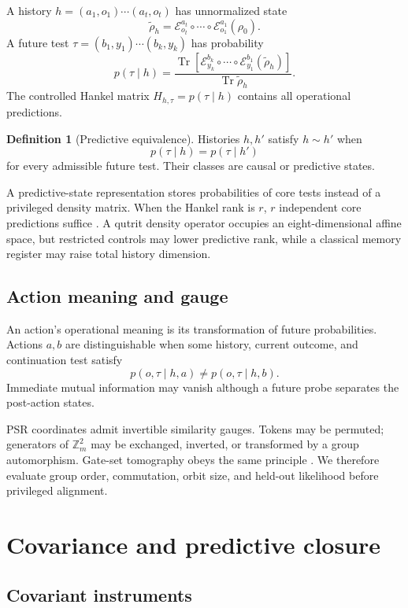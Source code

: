\documentclass[11pt]{article}
\theoremstyle{definition}
\newtheorem{definition}[theorem]{Definition}
\theoremstyle{remark}
\newcommand{\cE}{\mathcal E}
\newcommand{\Tr}{\operatorname{Tr}}
\newcommand{\Z}{\mathbb Z}
\begin{document}
A history \(h=(a_1,o_1)\cdots(a_t,o_t)\) has unnormalized state
\[
\widetilde\rho_h=
\cE_{o_t}^{a_t}\circ\cdots\circ\cE_{o_1}^{a_1}(\rho_0).
\]
A future test \(\tau=(b_1,y_1)\cdots(b_k,y_k)\) has probability
\[
p(\tau\mid h)=
\frac{\Tr[
\cE_{y_k}^{b_k}\circ\cdots\circ\cE_{y_1}^{b_1}
(\widetilde\rho_h)]}{\Tr\widetilde\rho_h}.
\]
The controlled Hankel matrix \(H_{h,\tau}=p(\tau\mid h)\) contains all
operational predictions.

\begin{definition}[Predictive equivalence]
Histories \(h,h'\) satisfy \(h\sim h'\) when
\[
p(\tau\mid h)=p(\tau\mid h')
\]
for every admissible future test. Their classes are causal or predictive
states.
\end{definition}

A predictive-state representation stores probabilities of core tests instead
of a privileged density matrix. When the Hankel rank is \(r\), \(r\)
independent core predictions suffice \cite{Littman2001}. A qutrit density
operator occupies an eight-dimensional affine space, but restricted controls
may lower predictive rank, while a classical memory register may raise total
history dimension.

\subsection{Action meaning and gauge}

An action's operational meaning is its transformation of future
probabilities. Actions \(a,b\) are distinguishable when some history, current
outcome, and continuation test satisfy
\[
p(o,\tau\mid h,a)\ne p(o,\tau\mid h,b).
\]
Immediate mutual information may vanish although a future probe separates the
post-action states.

PSR coordinates admit invertible similarity gauges. Tokens may be permuted;
generators of \(\Z_m^2\) may be exchanged, inverted, or transformed by a
group automorphism. Gate-set tomography obeys the same principle
\cite{NielsenGST2020,DiMatteo2020}. We therefore evaluate group order,
commutation, orbit size, and held-out likelihood before privileged alignment.

\section{Covariance and predictive closure}

\subsection{Covariant instruments}
\end{document}
